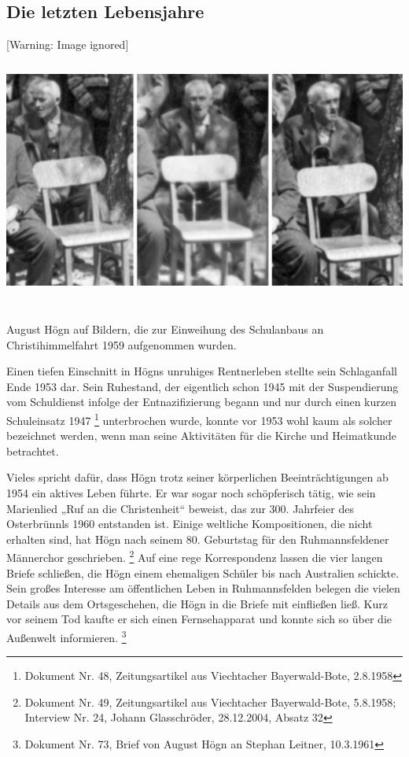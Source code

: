 \subsection{Die letzten Lebensjahre}

  [Warning: Image ignored]
\includegraphics[width=15.981cm,height=8.56cm]{pictures/zulassungsarbeit-img053.jpg}


August Högn auf Bildern, die zur
Einweihung des Schulanbaus an Christihimmelfahrt 1959 aufgenommen
wurden.

Einen tiefen Einschnitt in Högns unruhiges Rentnerleben stellte sein
Schlaganfall Ende 1953 dar. Sein Ruhestand, der eigentlich schon 1945
mit der Suspendierung vom Schuldienst infolge der Entnazifizierung
begann und nur durch einen kurzen Schuleinsatz 1947 \footnote{Dokument
Nr. 48, Zeitungsartikel aus Viechtacher Bayerwald-Bote, 2.8.1958}
unterbrochen wurde, konnte vor 1953 wohl kaum als solcher bezeichnet
werden, wenn man seine Aktivitäten für die Kirche und Heimatkunde
betrachtet.

Vieles spricht dafür, dass Högn trotz seiner körperlichen
Beeinträchtigungen ab 1954 ein aktives Leben führte. Er war sogar noch
schöpferisch tätig, wie sein Marienlied „Ruf an die Christenheit“
beweist, das zur 300. Jahrfeier des Osterbrünnls 1960 entstanden ist.
Einige weltliche Kompositionen, die nicht erhalten sind, hat Högn nach
seinem 80. Geburtstag für den Ruhmannsfeldener Männerchor
geschrieben. \footnote{Dokument Nr. 49, Zeitungsartikel aus Viechtacher
Bayerwald-Bote, 5.8.1958; Interview Nr. 24, Johann Glasschröder,
28.12.2004, Absatz 32} Auf eine rege Korrespondenz lassen die vier
langen Briefe schließen, die Högn einem ehemaligen Schüler bis nach
Australien schickte. Sein großes Interesse am öffentlichen Leben in
Ruhmannsfelden belegen die vielen Details aus dem Ortsgeschehen, die
Högn in die Briefe mit einfließen ließ. Kurz vor seinem Tod kaufte er
sich einen Fernsehapparat und konnte sich so über die Außenwelt
informieren. \footnote{Dokument Nr. 73, Brief von August Högn an
Stephan Leitner, 10.3.1961}

